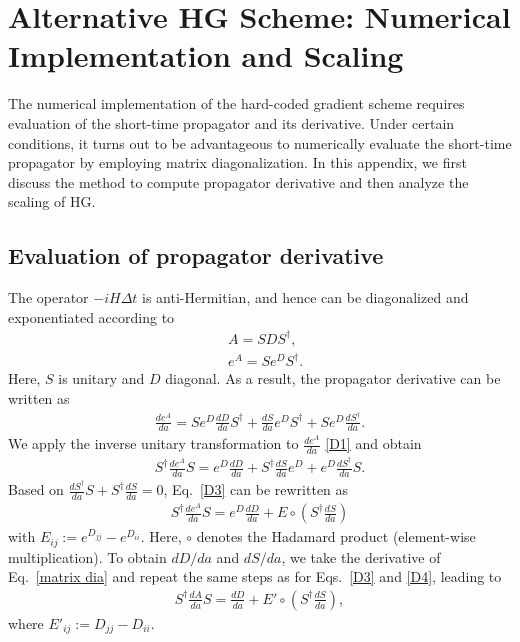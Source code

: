 \documentclass[12pt]{article}
\begin{document}
\section{Alternative HG Scheme: Numerical Implementation and Scaling}
\label{scalingmatrixdiag}
The numerical implementation of the hard-coded gradient scheme requires evaluation of the short-time propagator and its derivative. Under certain conditions, it turns out to be advantageous to numerically evaluate the short-time propagator by employing matrix diagonalization. In this appendix, we first discuss the method to compute propagator derivative and then analyze the scaling of HG.


\subsection{Evaluation of propagator derivative }
The operator $-iH\Delta t$ is anti-Hermitian, and hence can be diagonalized and exponentiated according to 
\begin{align}
\label{matrix dia}    &A=SDS^\dagger,\\
    &e^A=Se^DS^\dagger.
\end{align}
Here, $S$ is unitary and $D$ diagonal. As a result, the propagator derivative can be written as
\begin{align}
\label{D1}
    \frac{d e^{A}}{d a}=Se^D\frac{dD}{da}S^\dagger+\frac{dS}{da}e^DS^\dagger+Se^D\frac{dS^\dagger}{da}.
\end{align}
We apply the inverse unitary transformation to $\frac{d e^{A}}{d a}$ \eqref{D1} and obtain
\begin{align}
\label{D3}
    S^\dagger\frac{de^A}{da}S=e^D\frac{dD}{da}+S^\dagger\frac{dS}{da}e^D+e^D\frac{dS^\dagger}{da}S.
\end{align}
Based on $\frac{dS^\dagger}{da}S+S^\dagger\frac{dS}{da}=0$, Eq.\ \eqref{D3} can be rewritten as 
\begin{align}
\label{D4}
    S^\dagger \frac{de^A}{da}S=e^D\frac{dD}{da}+E\circ(S^\dagger\frac{dS}{da})
\end{align}
with $E_{ij}:=e^{D_{jj}}-e^{D_{ii}}$. Here, $\circ$ denotes the Hadamard product (element-wise multiplication). To obtain $dD/da$ and $dS/da$, we take the derivative of Eq.\ \eqref{matrix dia} and repeat the same steps as for Eqs.\ \eqref{D3} and \eqref{D4}, leading to
\begin{align}
\label{D5}
    S^\dagger\frac{dA}{da}S=\frac{dD}{da}+E'\circ(S^\dagger\frac{dS}{da}),
\end{align}
where $E'_{ij}:=D_{jj}-D_{ii}$. 
\end{document}

